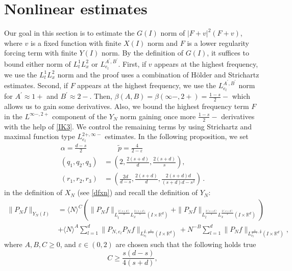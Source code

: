 \documentclass[10pt,leqno]{amsart}
\newcommand{\R}{\mathbb{R}}
\numberwithin{equation}{section}
\begin{document}
\section{Nonlinear estimates}\label{sec:nonlin}
Our goal in this section is to estimate the $G (I)$ norm of $|F+v|^2 (F+v)$, where $v$ is a fixed function 
with finite $X(I)$ norm and $F$ is a lower regularity forcing term with finite $Y(I)$ norm. By  the definition of $G(I)$, it suffices to
bound either norm of $L^1_t L^2_x$ or $L_{e_l}^{A^\prime,B^\prime}$. 
First, if $v$ appears at the 
highest frequency, we  use the $L^1_t L^2_x$ norm and the proof uses a combination of H\" older and Strichartz estimates. Second, if $F$ appears at the highest frequency, 
we  use the $L_{e_l}^{A^\prime,B^\prime}$ norm for $A^\prime\approx 1+$ and $B^\prime\approx 2-$. Then, 
$\beta (A,B)=\beta (\infty- , 2+)= \frac{1-s}{2}-$ which allows us to  gain some derivatives. Also, we bound the highest frequency term $F$ in the $L^{\infty- ,2+}$ component of the $Y_N$ norm 
gaining once more $ \frac{1-s}{2}-$ derivatives with the help of \eqref{IK3}. We control the remaining terms by using Strichartz and maximal function type $L_{e_l}^{2+,\infty-}$ estimates. 
In the following proposition, we set 
\begin{equation}\label{parms}
\begin{aligned}
\alpha = \frac{d - s}{2} &\qquad \tilde{p} = \frac{4}{2 - \varepsilon} \\
(q_1, q_2, q_3) &= \left(2, \frac{2(s+d)}{d}, \frac{2(s+d)}{s}\right), \\
 (r_1, r_2, r_3) &= \left(\frac{2d}{d-s}, \frac{2(s+d)}{d}, \frac{2(s+d)d}{(s+d)d - s^2}\right) \,.
\end{aligned}
\end{equation}
in the definition of  $X_N$ (see \eqref{dfxn})
and recall the definition of $Y_N$: 
\begin{align*}
\|P_N f\|_{Y_N(I)}&= \langle N\rangle^C \left(\|P_N f\|_{L_t^{\frac{2(s+d)}{d}} L_x^{\frac{2(s+d)}{s}} (I\times \R^d)} +\|P_N f\|_{L_t^{\frac{2(s+d)}{s}} L_x^{\frac{2(s+d)}{s}}(I\times \R^d) } \right)\\
&+\langle N\rangle^A \sum_{l=1}^d \|P_{N,e_l} P_N f \|_{L^{\frac{4}{\varepsilon},\frac{4}{2-\varepsilon}}_{e_l}(I\times \R^d) } +N^{-B} \sum_{l=1}^d \|P_N f\|_{L^{\frac{4}{2-\varepsilon},\frac{4}{\varepsilon}}_{e_l} (I\times \R^d) },  
\end{align*}
where $A, B, C \geq 0$, and $\varepsilon \in (0, 2)$ are chosen such that the following holds true
\begin{equation}\label{recc}
C \geq \frac{s(d-s)}{4(s+d)},
\end{equation} 
\end{document}
